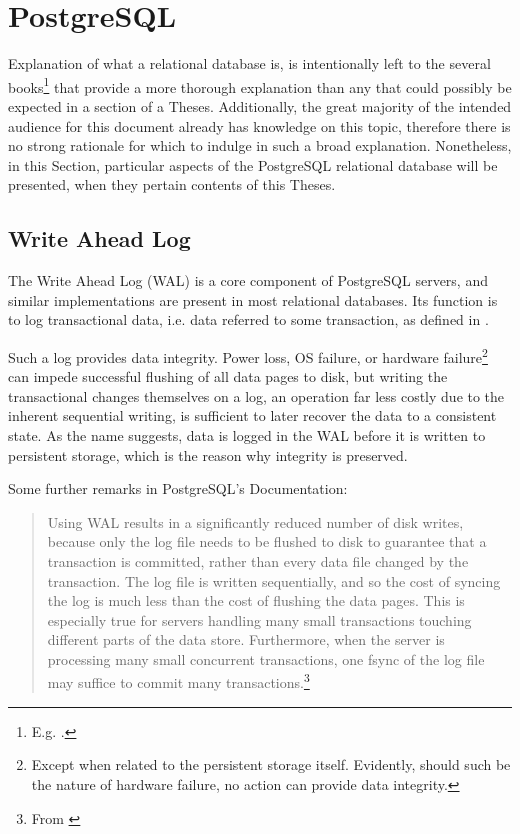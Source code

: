 \section{PostgreSQL}

Explanation of what a relational database is, is intentionally left to the several books\footnote{%
	E.g. \cite{dbms}.
} that provide a more thorough explanation than any that could possibly be expected in a section of a Theses.
Additionally, the great majority of the intended audience for this document already has knowledge on this topic, therefore there is no strong rationale for which to indulge in such a broad explanation.
Nonetheless, in this Section, particular aspects of the PostgreSQL relational database will be presented, when they pertain contents of this Theses.


\subsection{Write Ahead Log}
\label{sec:wal}

The Write Ahead Log (WAL) is a core component of PostgreSQL servers, and similar implementations are present in most relational databases.
Its function is to log transactional data, i.e. data referred to some transaction, as defined in \cite[\S 16.2]{dbms}.

Such a log provides data integrity.
Power loss, OS failure, or hardware failure\footnote{%
	Except when related to the persistent storage itself.
	Evidently, should such be the nature of hardware failure, no action can provide data integrity.
} can impede successful flushing of all data pages to disk, but writing the transactional changes themselves on a log, an operation far less costly due to the inherent sequential writing, is sufficient to later recover the data to a consistent state.
As the name suggests, data is logged in the WAL before it is written to persistent storage, which is the reason why integrity is preserved.

Some further remarks in PostgreSQL's Documentation:
\begin{quote}
	Using WAL results in a significantly reduced number of disk writes, because only the log file needs to be flushed to disk to guarantee that a transaction is committed, rather than every data file changed by the transaction. The log file is written sequentially, and so the cost of syncing the log is much less than the cost of flushing the data pages. This is especially true for servers handling many small transactions touching different parts of the data store. Furthermore, when the server is processing many small concurrent transactions, one fsync of the log file may suffice to commit many transactions.\footnote{%
		From \cite[\S 29.2]{pg-docs}
	}
\end{quote}

